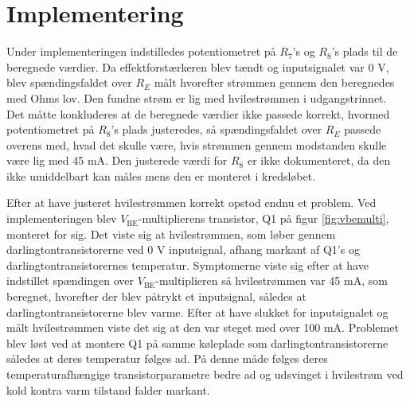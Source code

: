 \section{Implementering}
\label{effektforstaerker_implementering}

Under implementeringen indstilledes potentiometret på $R_7$'s og $R_8$'s plads til de beregnede værdier. Da effektforstærkeren blev tændt og inputsignalet var 0 V, blev spændingsfaldet over $R_E$ målt hvorefter strømmen gennem den beregnedes med Ohms lov. Den fundne strøm er lig med hvilestrømmen i udgangstrinnet. Det måtte konkluderes at de beregnede værdier ikke passede korrekt, hvormed potentiometret på $R_8$'s plads justeredes, så spændingsfaldet over $R_E$ passede overens med, hvad det skulle være, hvis strømmen gennem modstanden skulle være lig med 45 mA. Den justerede værdi for $R_8$ er ikke dokumenteret, da den ikke umiddelbart kan måles mens den er monteret i kredsløbet.

Efter at have justeret hvilestrømmen korrekt opstod endnu et problem. Ved implementeringen blev $V_\mathrm{BE}$-multiplierens transistor, Q1 på figur \ref{fig:vbemulti}, monteret for sig. Det viste sig at hvilestrømmen, som løber gennem darlingtontransistorerne ved 0 V inputsignal, afhang markant af Q1's og darlingtontransistorernes temperatur. Symptomerne viste sig efter at have indstillet spændingen over $V_\mathrm{BE}$-multiplieren så hvilestrømmen var 45 mA, som beregnet, hvorefter der blev påtrykt et inputsignal, således at darlingtontransistorerne blev varme. Efter at have slukket for inputsignalet og målt hvilestrømmen viste det sig at den var steget med over 100 mA. Problemet blev løst ved at montere Q1 på samme køleplade som darlingtontransistorerne således at deres temperatur følges ad. På denne måde følges deres temperaturafhængige transistorparametre bedre ad og udsvinget i hvilestrøm ved kold kontra varm tilstand falder markant. 
